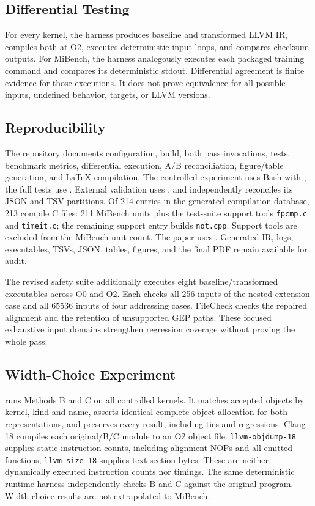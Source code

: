 \documentclass[11pt,twocolumn]{article}
\begin{document}
\subsection{Differential Testing}

For every kernel, the harness produces baseline and transformed LLVM IR,
compiles both at O2, executes deterministic input loops, and compares checksum
outputs. For MiBench, the harness analogously executes each packaged training
command and compares its deterministic stdout. Differential agreement
is finite evidence for those executions. It does not prove equivalence for all
possible inputs, undefined behavior, targets, or LLVM versions.

\subsection{Reproducibility}

The repository documents configuration, build, both pass invocations, tests,
benchmark metrics, differential execution, A/B reconciliation, figure/table
generation, and LaTeX compilation. The controlled experiment uses Bash with
; the full tests use
. External validation uses
, and
 independently reconciles its JSON and
TSV partitions. Of 214 entries in the generated compilation database, 213
compile C files: 211 MiBench units plus the test-suite support tools
\texttt{fpcmp.c} and \texttt{timeit.c}; the remaining support entry builds
\texttt{not.cpp}. Support tools are excluded from the MiBench unit count. The
paper uses . Generated IR, logs, executables, TSVs,
JSON, tables, figures, and the final PDF remain available for audit.

The revised safety suite additionally executes eight baseline/transformed
executables across O0 and O2. Each checks all 256 inputs of the nested-extension
case and all 65536 inputs of four addressing cases. FileCheck checks the repaired
alignment and the retention of unsupported GEP paths. These focused exhaustive
input domains strengthen regression coverage without proving the whole pass.

\subsection{Width-Choice Experiment}

 runs Methods B and C on all
\BenchmarkCount{} controlled kernels. It matches accepted objects by kernel,
kind and name, asserts identical complete-object allocation for both
representations, and preserves every result, including ties and regressions.
Clang 18 compiles each original/B/C module to an O2 object file.
\texttt{llvm-objdump-18} supplies static instruction counts, including alignment
NOPs and all emitted functions; \texttt{llvm-size-18} supplies text-section
bytes. These are neither dynamically executed instruction counts nor timings.
The same deterministic runtime harness independently checks B and C against
the original program. Width-choice results are not extrapolated to MiBench.
\end{document}
